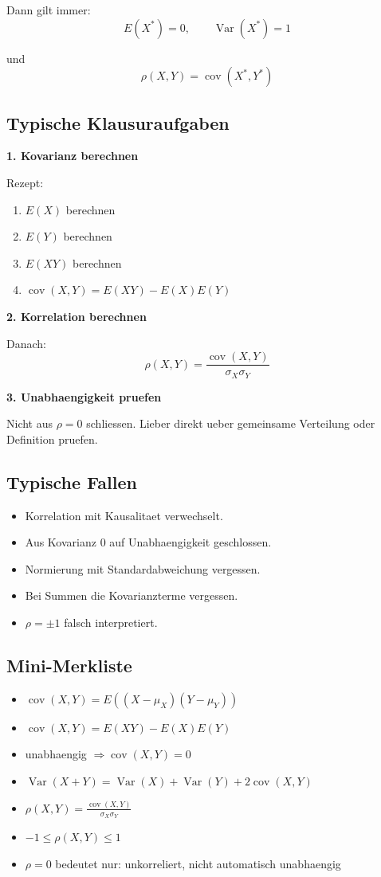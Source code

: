 \documentclass[a4paper,11pt]{article}
\begin{document}
Dann gilt immer:
\[
E(X^*)=0,\qquad \operatorname{Var}(X^*)=1
\]

und
\[
\rho(X,Y)=\operatorname{cov}(X^*,Y^*)
\]

\subsection{Typische Klausuraufgaben}
\textbf{1. Kovarianz berechnen}

Rezept:
\begin{enumerate}
  \item $E(X)$ berechnen
  \item $E(Y)$ berechnen
  \item $E(XY)$ berechnen
  \item $\operatorname{cov}(X,Y)=E(XY)-E(X)E(Y)$
\end{enumerate}

\textbf{2. Korrelation berechnen}

Danach:
\[
\rho(X,Y)=\frac{\operatorname{cov}(X,Y)}{\sigma_X\sigma_Y}
\]

\textbf{3. Unabhaengigkeit pruefen}

Nicht aus $\rho=0$ schliessen.
Lieber direkt ueber gemeinsame Verteilung oder Definition pruefen.

\subsection{Typische Fallen}
\begin{itemize}
  \item Korrelation mit Kausalitaet verwechselt.
  \item Aus Kovarianz $0$ auf Unabhaengigkeit geschlossen.
  \item Normierung mit Standardabweichung vergessen.
  \item Bei Summen die Kovarianzterme vergessen.
  \item $\rho=\pm 1$ falsch interpretiert.
\end{itemize}

\subsection{Mini-Merkliste}
\begin{itemize}
  \item $\displaystyle \operatorname{cov}(X,Y)=E((X-\mu_X)(Y-\mu_Y))$
  \item $\displaystyle \operatorname{cov}(X,Y)=E(XY)-E(X)E(Y)$
  \item unabhaengig $\Rightarrow \operatorname{cov}(X,Y)=0$
  \item $\displaystyle \operatorname{Var}(X+Y)=\operatorname{Var}(X)+\operatorname{Var}(Y)+2\operatorname{cov}(X,Y)$
  \item $\displaystyle \rho(X,Y)=\frac{\operatorname{cov}(X,Y)}{\sigma_X\sigma_Y}$
  \item $\displaystyle -1\le \rho(X,Y)\le 1$
  \item $\rho=0$ bedeutet nur: unkorreliert, nicht automatisch unabhaengig
\end{itemize}
\end{document}
